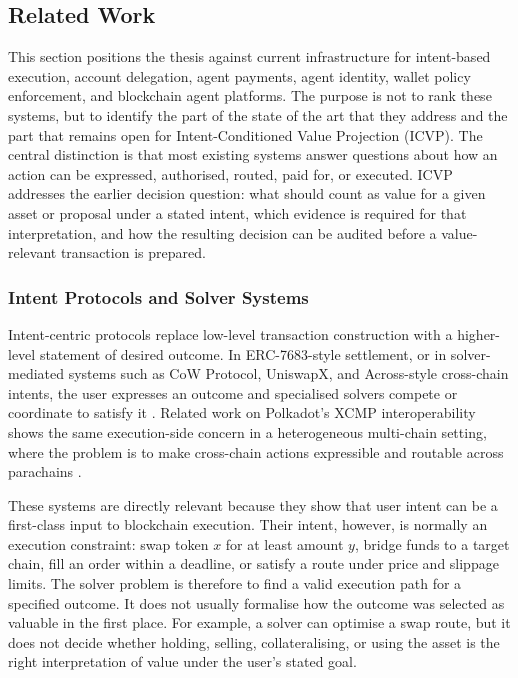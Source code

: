 \subsection{Related Work}
\label{sec:relatedwork}

This section positions the thesis against current infrastructure for
intent-based execution, account delegation, agent payments, agent identity,
wallet policy enforcement, and blockchain agent platforms. The purpose is not
to rank these systems, but to identify the part of the state of the art that
they address and the part that remains open for Intent-Conditioned Value
Projection (ICVP). The central distinction is that most existing systems answer
questions about how an action can be expressed, authorised, routed, paid for, or
executed. ICVP addresses the earlier decision question: what should count as
value for a given asset or proposal under a stated intent, which evidence is
required for that interpretation, and how the resulting decision can be audited
before a value-relevant transaction is prepared.

\subsubsection{Intent Protocols and Solver Systems}

Intent-centric protocols replace low-level transaction construction with a
higher-level statement of desired outcome. In ERC-7683-style settlement, or in
solver-mediated systems such as CoW Protocol, UniswapX, and Across-style
cross-chain intents, the user expresses an outcome and specialised solvers
compete or coordinate to satisfy it \cite{ERC7683, Nag2025CoWMechanism,
UniswapXWhitepaper, AcrossCrosschainIntents}. Related work on Polkadot's XCMP
interoperability shows the same execution-side concern in a heterogeneous
multi-chain setting, where the problem is to make cross-chain actions expressible
and routable across parachains \cite{Morhac2023xcmp}.

These systems are directly relevant because they show that user intent can be a
first-class input to blockchain execution. Their intent, however, is normally an
execution constraint: swap token $x$ for at least amount $y$, bridge funds to a
target chain, fill an order within a deadline, or satisfy a route under price
and slippage limits. The solver problem is therefore to find a valid execution
path for a specified outcome. It does not usually formalise how the outcome was
selected as valuable in the first place. For example, a solver can optimise a
swap route, but it does not decide whether holding, selling, collateralising, or
using the asset is the right interpretation of value under the user's stated
goal.

